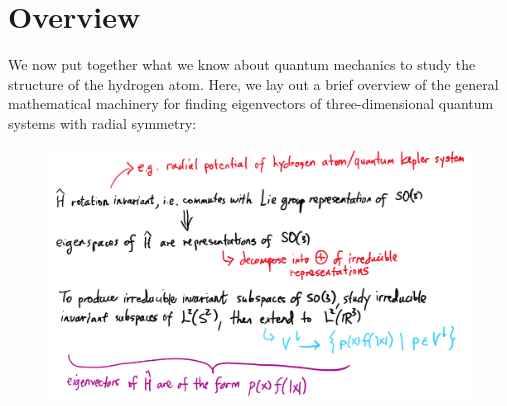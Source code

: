 \section{Overview}
We now put together what we know about quantum mechanics to study the structure of the hydrogen atom. Here, we lay out a brief overview of the general mathematical machinery for finding eigenvectors of three-dimensional quantum systems with radial symmetry:
\begin{figure}[ht]
    \includegraphics[width=\textwidth]{figures/quantum_kepler}
    \centering
\end{figure}
